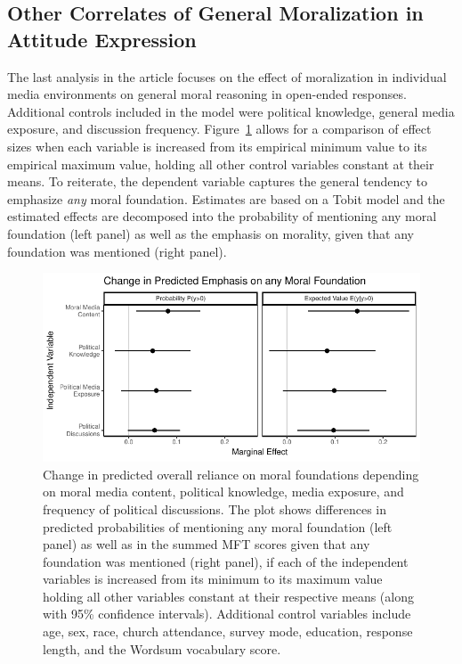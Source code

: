 \documentclass[12pt]{article}
\begin{document}


\clearpage
\subsection{Other Correlates of General Moralization in Attitude Expression}

The last analysis in the article focuses on the effect of moralization in individual media environments on general moral reasoning in open-ended responses. Additional controls included in the model were political knowledge, general media exposure, and discussion frequency. Figure~\ref{fig:tobit_learn} allows for a comparison of effect sizes when each variable is increased from its empirical minimum value to its empirical maximum value, holding all other control variables constant at their means. To reiterate, the dependent variable captures the general tendency to emphasize \textit{any} moral foundation. Estimates are based on a Tobit model and the estimated effects are decomposed into the probability of mentioning any moral foundation (left panel) as well as the emphasis on morality, given that any foundation was mentioned (right panel).

\begin{figure}[h]\centering
\includegraphics{../calc/fig/tobit_learn.pdf}
\caption{Change in predicted overall reliance on moral foundations depending on moral media content, political knowledge, media exposure, and frequency of political discussions. The plot shows differences in predicted probabilities of mentioning any moral foundation (left panel) as well as in the summed MFT scores given that any foundation was mentioned (right panel), if each of the independent variables is increased from its minimum to its maximum value holding all other variables constant at their respective means (along with 95\% confidence intervals). Additional control variables include age, sex, race, church attendance, survey mode, education, response length, and the Wordsum vocabulary score. 
}\label{fig:tobit_learn}
\end{figure}
\end{document}
